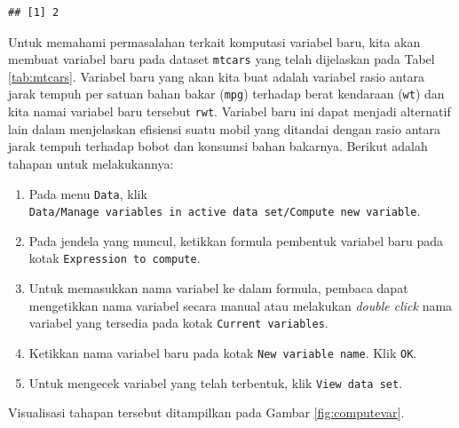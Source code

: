 \documentclass[12pt,]{krantz}
\providecommand{\tightlist}{%
  \setlength{\itemsep}{0pt}\setlength{\parskip}{0pt}}
\begin{document}
\begin{verbatim}
## [1] 2
\end{verbatim}

Untuk memahami permasalahan terkait komputasi variabel baru, kita akan membuat variabel baru pada dataset \texttt{mtcars} yang telah dijelaskan pada Tabel \ref{tab:mtcars}. Variabel baru yang akan kita buat adalah variabel rasio antara jarak tempuh per satuan bahan bakar (\texttt{mpg}) terhadap berat kendaraan (\texttt{wt}) dan kita namai variabel baru tersebut \texttt{rwt}. Variabel baru ini dapat menjadi alternatif lain dalam menjelaskan efisiensi suatu mobil yang ditandai dengan rasio antara jarak tempuh terhadap bobot dan konsumsi bahan bakarnya. Berikut adalah tahapan untuk melakukannya:

\begin{enumerate}
\def\labelenumi{\arabic{enumi}.}
\tightlist
\item
  Pada menu \texttt{Data}, klik \texttt{Data/Manage\ variables\ in\ active\ data\ set/Compute\ new\ variable}.
\item
  Pada jendela yang muncul, ketikkan formula pembentuk variabel baru pada kotak \texttt{Expression\ to\ compute}.
\item
  Untuk memasukkan nama variabel ke dalam formula, pembaca dapat mengetikkan nama variabel secara manual atau melakukan \emph{double click} nama variabel yang tersedia pada kotak \texttt{Current\ variables}.
\item
  Ketikkan nama variabel baru pada kotak \texttt{New\ variable\ name}. Klik \texttt{OK}.
\item
  Untuk mengecek variabel yang telah terbentuk, klik \texttt{View\ data\ set}.
\end{enumerate}

Visualisasi tahapan tersebut ditampilkan pada Gambar \ref{fig:computevar}.
\end{document}
